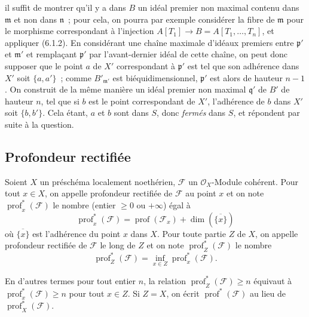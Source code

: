 \begin{env}[10.7.3]
il suffit de montrer qu'il y a dans $B$ un idéal premier non maximal contenu dans
$\mathfrak m$ et non dans $\mathfrak n$~; pour cela, on pourra par exemple
considérer la fibre de $\mathfrak m$ pour le morphisme correspondant à l'injection
$A[T_1]\to B=A[T_1,\ldots,T_n]$, et appliquer (6.1.2). En considérant une chaîne
maximale d'idéaux premiers entre $\mathfrak p'$ et $\mathfrak m'$ et remplaçant
$\mathfrak p'$ par l'avant-dernier idéal de cette chaîne, on peut donc supposer
que le point $a$ de $X'$ correspondant à $\mathfrak p'$ est tel que son adhérence
dans $X'$ soit $\{a,a'\}$~; comme $B'_{\mathfrak m'}$ est biéquidimensionnel,
$\mathfrak p'$ est alors de hauteur $n-1$. On construit de la même manière un
idéal premier non maximal $\mathfrak q'$ de $B'$ de hauteur $n$, tel que si $b$
est le point correspondant de $X'$, l'adhérence de $b$ dans $X'$ soit
$\{b,b'\}$. Cela étant, $a$ et $b$ sont dans $S$, donc \emph{fermés} dans $S$,
et répondent par suite à la question.
\end{env}

\subsection{Profondeur rectifiée}
\label{subsection:IV.10.8-fr}

\begin{definition}[10.8.1]
\label{IV.10.8.1-fr}
Soient $X$ un préschéma localement noethérien, $\mathcal F$ un $\mathcal O_X$-Module
cohérent. Pour tout $x\in X$, on appelle profondeur rectifiée de $\mathcal F$
au point $x$ et on note $\operatorname{prof}^{*}_{x}(\mathcal F)$ le nombre (entier
$\geq0$ ou $+\infty$) égal à
\begin{equation}
\label{IV.10.8.1.1-fr}
\tag{10.8.1.1}
\operatorname{prof}^{*}_{x}(\mathcal F)
=\operatorname{prof}(\mathcal F_x)+\dim(\overline{\{x\}})
\end{equation}
où $\overline{\{x\}}$ est l'adhérence du point $x$ dans $X$. Pour toute partie
$Z$ de $X$, on appelle profondeur rectifiée de $\mathcal F$ le long de $Z$
et on note $\operatorname{prof}^{*}_{Z}(\mathcal F)$ le nombre
\begin{equation}
\label{IV.10.8.1.2-fr}
\tag{10.8.1.2}
\operatorname{prof}^{*}_{Z}(\mathcal F)
=\inf_{x\in Z}\operatorname{prof}^{*}_{x}(\mathcal F).
\end{equation}
\end{definition}

En d'autres termes pour tout entier $n$, la relation
$\operatorname{prof}^{*}_{Z}(\mathcal F)\geq n$ équivaut à
$\operatorname{prof}^{*}_{x}(\mathcal F)\geq n$ pour tout $x\in Z$. Si $Z=X$, on
écrit $\operatorname{prof}^{*}(\mathcal F)$ au lieu de
$\operatorname{prof}^{*}_{X}(\mathcal F)$.

